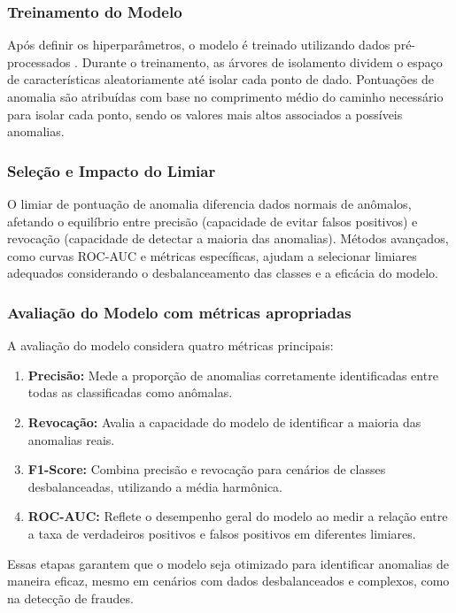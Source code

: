 \documentclass[12pt,a4paper]{article}
\begin{document}
\subsubsection{Treinamento do Modelo}
Após definir os hiperparâmetros, o modelo é treinado utilizando dados pré-processados \cite{meduri2024}. Durante o treinamento, as árvores de isolamento dividem o espaço de características aleatoriamente até isolar cada ponto de dado. Pontuações de anomalia são atribuídas com base no comprimento médio do caminho necessário para isolar cada ponto, sendo os valores mais altos associados a possíveis anomalias.

\subsubsection{Seleção e Impacto do Limiar}
O limiar de pontuação de anomalia diferencia dados normais de anômalos, afetando o equilíbrio entre precisão (capacidade de evitar falsos positivos) e revocação (capacidade de detectar a maioria das anomalias). Métodos avançados, como curvas ROC-AUC e métricas específicas, ajudam a selecionar limiares adequados considerando o desbalanceamento das classes e a eficácia do modelo.

\subsubsection{Avaliação do Modelo com métricas apropriadas}
A avaliação do modelo considera quatro métricas principais:
\begin{enumerate}
    \item \textbf{Precisão:} Mede a proporção de anomalias corretamente identificadas entre todas as classificadas como anômalas.
    \item \textbf{Revocação:} Avalia a capacidade do modelo de identificar a maioria das anomalias reais.
    \item \textbf{F1-Score:} Combina precisão e revocação para cenários de classes desbalanceadas, utilizando a média harmônica.
    \item \textbf{ROC-AUC:} Reflete o desempenho geral do modelo ao medir a relação entre a taxa de verdadeiros positivos e falsos positivos em diferentes limiares.
\end{enumerate}

Essas etapas garantem que o modelo seja otimizado para identificar anomalias de maneira eficaz, mesmo em cenários com dados desbalanceados e complexos, como na detecção de fraudes.
\end{document}
